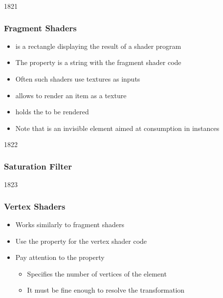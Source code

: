 
\begin{slide}{1821}\frametitle{Fragment Shaders}

\begin{itemize}
\item {} is a rectangle displaying the result of a shader program
\item The  property is a string with the fragment shader code
\item Often such shaders use textures as inputs
\vspace*{1em}
\item {} allows to render an item as a texture
\item {} holds the  to be rendered
\vspace*{1em}
\item Note that  is an invisible element aimed at consumption in  instances
\end{itemize}

\end{slide}


\begin{slide}{1822}\frametitle{Saturation Filter}


\vspace*{-20em}\hfill{}
\end{slide}


\begin{slide}{1823}\frametitle{Vertex Shaders}

\begin{itemize}
\item Works similarly to fragment shaders
\item Use the  property for the vertex shader code
\item Pay attention to the  property
  \begin{itemize}
  \item Specifies the number of vertices of the  element
  \item It must be fine enough to resolve the transformation
  \end{itemize}
\end{itemize}

\end{slide}

